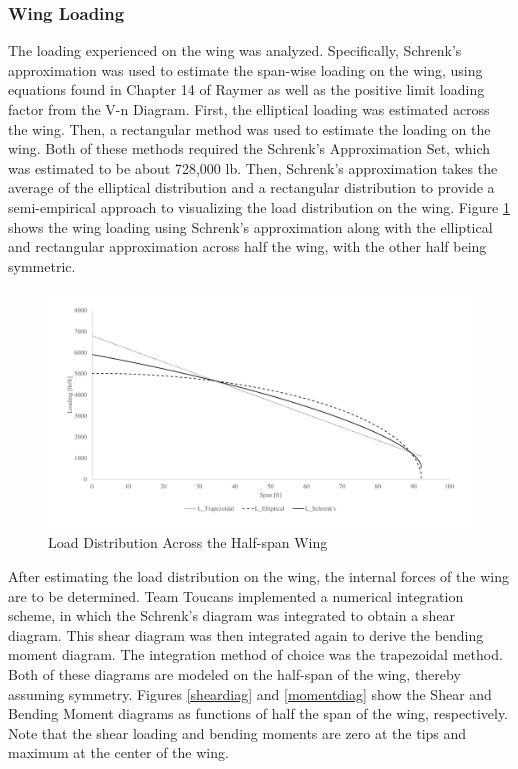\subsubsection{Wing Loading}
\label{winlod}
The loading experienced on the wing was analyzed. Specifically, Schrenk's approximation was used to estimate the span-wise loading on the wing, using equations found in Chapter 14 of Raymer \cite{raymer} as well as the positive limit loading factor from the V-n Diagram. First, the elliptical loading was estimated across the wing. Then, a rectangular method was used to estimate the loading on the wing. Both of these methods required the Schrenk's Approximation Set, which was estimated to be about 728,000 lb. Then, Schrenk's approximation takes the average of the elliptical distribution and a rectangular distribution to provide a semi-empirical approach to visualizing the load distribution on the wing. Figure \ref{schrenk} shows the wing loading using Schrenk's approximation along with the elliptical and rectangular approximation across half the wing, with the other half being symmetric. 

\begin{figure}[H]
    \centering
    \includegraphics[width=1.0\linewidth]{Photos/Schrenks.pdf}
    \caption{Load Distribution Across the Half-span Wing}
    \label{schrenk}
\end{figure}

After estimating the load distribution on the wing, the internal forces of the wing are to be determined. Team Toucans implemented a numerical integration scheme, in which the Schrenk's diagram was integrated to obtain a shear diagram. This shear diagram was then integrated again to derive the bending moment diagram. The integration method of choice was the trapezoidal method. Both of these diagrams are modeled on the half-span of the wing, thereby assuming symmetry. Figures \ref{sheardiag} and \ref{momentdiag} show the Shear and Bending Moment diagrams as functions of half the span of the wing, respectively. Note that the shear loading and bending moments are zero at the tips and maximum at the center of the wing. 

